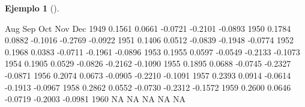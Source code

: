 \documentclass[
  us-letterpaper,
]{scrreprt}
\newenvironment{Shaded}{\begin{snugshade}}{\end{snugshade}}
\newcommand{\ConstantTok}[1]{\textcolor[rgb]{0.56,0.35,0.01}{#1}}
\newcommand{\DecValTok}[1]{\textcolor[rgb]{0.68,0.00,0.00}{#1}}
\newcommand{\FloatTok}[1]{\textcolor[rgb]{0.68,0.00,0.00}{#1}}
\newcommand{\NormalTok}[1]{\textcolor[rgb]{0.00,0.23,0.31}{#1}}
\newcommand{\SpecialCharTok}[1]{\textcolor[rgb]{0.37,0.37,0.37}{#1}}
\theoremstyle{plain}
\theoremstyle{definition}
\theoremstyle{definition}
\newtheorem{example}{Ejemplo}[chapter]
\theoremstyle{plain}
\theoremstyle{remark}
\begin{document}
\begin{example}[]
\begin{tcolorbox}
\begin{enumerate}
\begin{Shaded}
\begin{Highlighting}[]
\NormalTok{         Aug     Sep     Oct     Nov     Dec}
\DecValTok{1949}  \FloatTok{0.1561}  \FloatTok{0.0661} \SpecialCharTok{{-}}\FloatTok{0.0721} \SpecialCharTok{{-}}\FloatTok{0.2101} \SpecialCharTok{{-}}\FloatTok{0.0893}
\DecValTok{1950}  \FloatTok{0.1784}  \FloatTok{0.0882} \SpecialCharTok{{-}}\FloatTok{0.1016} \SpecialCharTok{{-}}\FloatTok{0.2769} \SpecialCharTok{{-}}\FloatTok{0.0922}
\DecValTok{1951}  \FloatTok{0.1406}  \FloatTok{0.0512} \SpecialCharTok{{-}}\FloatTok{0.0839} \SpecialCharTok{{-}}\FloatTok{0.1948} \SpecialCharTok{{-}}\FloatTok{0.0774}
\DecValTok{1952}  \FloatTok{0.1968}  \FloatTok{0.0383} \SpecialCharTok{{-}}\FloatTok{0.0711} \SpecialCharTok{{-}}\FloatTok{0.1961} \SpecialCharTok{{-}}\FloatTok{0.0896}
\DecValTok{1953}  \FloatTok{0.1955}  \FloatTok{0.0597} \SpecialCharTok{{-}}\FloatTok{0.0549} \SpecialCharTok{{-}}\FloatTok{0.2133} \SpecialCharTok{{-}}\FloatTok{0.1073}
\DecValTok{1954}  \FloatTok{0.1905}  \FloatTok{0.0529} \SpecialCharTok{{-}}\FloatTok{0.0826} \SpecialCharTok{{-}}\FloatTok{0.2162} \SpecialCharTok{{-}}\FloatTok{0.1090}
\DecValTok{1955}  \FloatTok{0.1895}  \FloatTok{0.0688} \SpecialCharTok{{-}}\FloatTok{0.0745} \SpecialCharTok{{-}}\FloatTok{0.2327} \SpecialCharTok{{-}}\FloatTok{0.0871}
\DecValTok{1956}  \FloatTok{0.2074}  \FloatTok{0.0673} \SpecialCharTok{{-}}\FloatTok{0.0905} \SpecialCharTok{{-}}\FloatTok{0.2210} \SpecialCharTok{{-}}\FloatTok{0.1091}
\DecValTok{1957}  \FloatTok{0.2393}  \FloatTok{0.0914} \SpecialCharTok{{-}}\FloatTok{0.0614} \SpecialCharTok{{-}}\FloatTok{0.1913} \SpecialCharTok{{-}}\FloatTok{0.0967}
\DecValTok{1958}  \FloatTok{0.2862}  \FloatTok{0.0552} \SpecialCharTok{{-}}\FloatTok{0.0730} \SpecialCharTok{{-}}\FloatTok{0.2312} \SpecialCharTok{{-}}\FloatTok{0.1572}
\DecValTok{1959}  \FloatTok{0.2600}  \FloatTok{0.0646} \SpecialCharTok{{-}}\FloatTok{0.0719} \SpecialCharTok{{-}}\FloatTok{0.2003} \SpecialCharTok{{-}}\FloatTok{0.0981}
\DecValTok{1960}      \ConstantTok{NA}      \ConstantTok{NA}      \ConstantTok{NA}      \ConstantTok{NA}      \ConstantTok{NA}
\end{Highlighting}
\end{Shaded}
\end{enumerate}

\begin{figure}[H]

\begin{minipage}{0.50\linewidth}

\centering{

}
\end{minipage}
\end{figure}
\end{tcolorbox}
\end{example}
\end{document}
